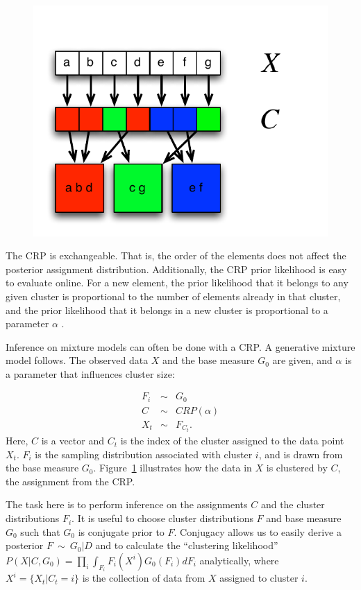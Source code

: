 \begin{figure}[t]
\begin{center}
\includegraphics[width=0.4\linewidth]{crp-mixture.pdf}
\caption{}
\label{intro:crp-mixture}
\end{center}
\end{figure}



The CRP is exchangeable. That is, the order of the elements does not affect the posterior assignment distribution.  Additionally, the CRP prior likelihood is easy to evaluate online. For a new element, the prior likelihood that it belongs to any given cluster is proportional to the number of elements already in that cluster, and the prior likelihood that it belongs in a new cluster is proportional to a parameter $\alpha$ .

Inference on mixture models can often be done with a CRP. A generative mixture model follows. The observed data $X$ and the base measure $G_0$ are given, and $\alpha$ is a parameter that influences cluster size:

\begin{eqnarray}
F_i&\sim&G_0\\
C&\sim&CRP(\alpha)\\
X_t&\sim&F_{C_t}.
\end{eqnarray}
Here, $C$ is a vector and $C_t$ is the index of the cluster assigned to the data point $X_t$. $F_i$ is the sampling distribution associated with cluster $i$, and is drawn from the base measure $G_0$. Figure~\ref{intro:crp-mixture} illustrates how the data in $X$ is clustered by $C$, the assignment from the CRP.

The task here is to perform inference on the assignments $C$ and the cluster distributions $F_i$. It is useful to choose cluster distributions $F$ and base measure $G_0$ such that $G_0$ is conjugate prior to $F$. Conjugacy allows us to easily derive a posterior $F~\sim~G_0|D$ and to calculate the ``clustering likelihood'' $P(X|C,G_0)=\prod_i\int_{F_i} F_i(X^i)G_0(F_i)dF_i$ analytically, where $X^i=\{X_t|C_t=i\}$ is the collection of data from $X$ assigned to cluster $i$. 


